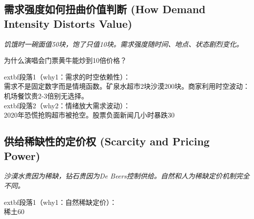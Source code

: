 \documentclass[a4paper,12pt]{book}
\newenvironment{motivation}{\begin{tcolorbox}[colback=gray!10,colframe=gray!60,title=\textit{本章动机},fonttitle=\bfseries,arc=0mm,leftrule=3mm]\small\itshape}{\end{tcolorbox}}
\newenvironment{questionbox}{\begin{tcolorbox}[colback=red!3!white,colframe=red!60!black]}{\end{tcolorbox}}
\begin{document}
	\subsection{需求强度如何扭曲价值判断 (How Demand Intensity Distorts Value)}
	\begin{motivation}饥饿时一碗面值50块，饱了只值10块。需求强度随时间、地点、状态剧烈变化。\end{motivation}
	\begin{questionbox}为什么演唱会门票黄牛能炒到10倍价格？\end{questionbox}
		extbf{段落1（why1：需求的时空依赖性）}：\\需求不是固定数字而是情境函数。矿泉水超市2块沙漠200块。商家利用时空波动：机场餐饮贵2-3倍别无选择。\\	extbf{段落2（why2：情绪放大需求波动）}：\\2020年恐慌抢购超市被抢空。股票负面新闻几小时暴跌30%

	\subsection{供给稀缺性的定价权 (Scarcity and Pricing Power)}
	\begin{motivation}沙漠水贵因为稀缺，钻石贵因为De Beers控制供给。自然和人为稀缺定价机制完全不同。\end{motivation}
		extbf{段落1（why1：自然稀缺定价）}：\\稀土60%
\end{document}

